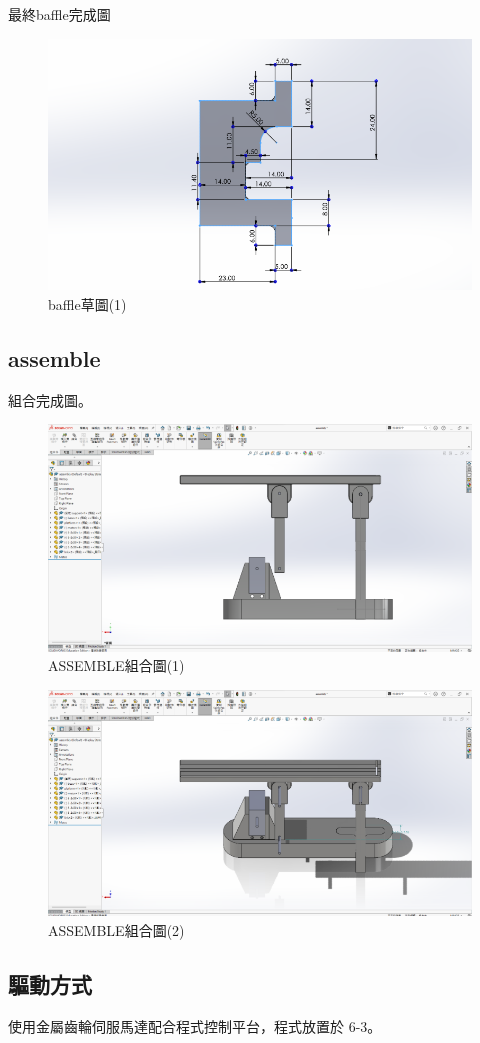 最終baffle完成圖

\begin{figure}[htbp]
    \centering
    \includegraphics[width=1\textwidth]{./../images/螢幕擷取畫面 2024-05-25 224335}
    \caption{baffle草圖(1)}
\end{figure}

\subsection*{assemble}

組合完成圖。

\begin{figure}[htbp]
    \centering
    \includegraphics[width=1\textwidth]{./../images/6-1-45}
    \caption{ASSEMBLE組合圖(1)}
\end{figure}

\begin{figure}[htbp]
    \centering
    \includegraphics[width=1\textwidth]{./../images/6-1-46}
    \caption{ASSEMBLE組合圖(2)}
\end{figure}


\subsection*{驅動方式}

使用金屬齒輪伺服馬達配合程式控制平台，程式放置於 6-3。


